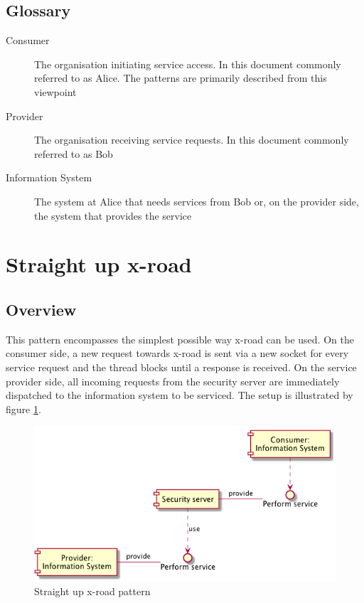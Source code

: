 \documentclass[10pt,a4paper]{article}
\begin{document}
\subsection{Glossary}
\begin{description}
	\item[Consumer] The organisation initiating service access. In this document commonly referred to as Alice. The patterns are primarily described from this viewpoint
	\item[Provider] The organisation receiving service requests. In this document commonly referred to as Bob 
	\item[Information System] The system at Alice that needs services from Bob or, on the provider side, the system that provides the service
\end{description}

\section{Straight up x-road}
\label{sec:p:1}
\subsection{Overview}
This pattern encompasses the simplest possible way x-road can be used. On the consumer side, a new request towards x-road is sent via a new socket for every service request and the thread blocks until a response is received. On the service provider side, all incoming requests from the security server are immediately dispatched to the information system to be serviced. The setup is illustrated by figure \ref{fig:p:1}. 

\begin{figure}[htp]
	\begin{center}
		\includegraphics[width=1\textwidth]{gfx/1_comp.png}
		\caption{Straight up x-road pattern}
		\label{fig:p:1}
	\end{center}
\end{figure}
\end{document}
